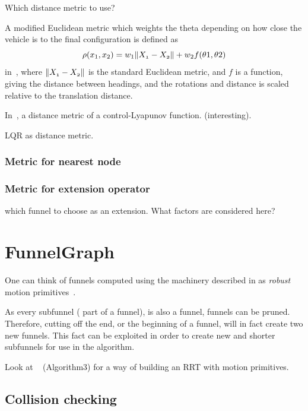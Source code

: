 Which distance metric to use?

A modified Euclidean metric which weights the theta depending on how close the
vehicle is to the final configuration is defined as
\[
  \rho(x_{1},x_{2}) = w_{1}\lVert\mathnormal{X_{1}} - \mathnormal{X_{2}}\rVert +
  w_{2}f(\theta{1},\theta{2})
\]
in~\cite{kuffnerEffectiveSamplingDistance2004}, where \(\lVert\mathnormal{X_{1}}
  - \mathnormal{X_{2}}\rVert\) is the standard Euclidean metric, and \(f\) is a
function, giving the distance between headings, and the rotations and distance
is scaled relative to the translation distance.

In~\cite{parkFeedbackMotionPlanning2015}, a distance metric of a
control-Lyapunov function. (interesting).

\cite{perezLQRRRTOptimalSamplingbased2012a} LQR as distance metric.

\subsubsection{Metric for nearest node}
\subsubsection{Metric for extension operator}

\ie which funnel to choose as an extension. What factors are considered here?

\section{FunnelGraph}

One can think of funnels computed using the machinery described in
\cite[sec~4]{majumdarFunnelLibrariesRealtime2017} as \textit{robust} motion
primitives~\cite{majumdarFunnelLibrariesRealtime2017}.

As every subfunnel (\ie{} part of a funnel), is also a funnel, funnels can be
pruned. Therefore, cutting off the end, or the beginning of a funnel, will in
fact create two new funnels. This fact can be exploited in order to create new
and shorter subfunnels for use in the \rrtfunnel{} algorithm.

Look at ~\cite{vonasekGlobalMotionPlanning2013} (Algorithm3) for a way of
building an RRT with motion primitives.

\subsection{Collision checking}

